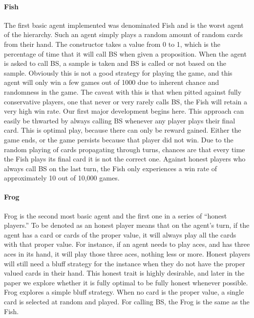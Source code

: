 \documentclass[a4paper,11pt]{article}
\begin{document}
	\paragraph{Fish}
	The first basic agent implemented was denominated Fish and is the worst agent of the hierarchy. Such an agent simply plays a random amount of random cards from their hand. The constructor takes a value from 0 to 1, which is the percentage of time that it will call BS when given a proposition. When the agent is asked to call BS, a sample is taken and BS is called or not based on the sample. Obviously this is not a good strategy for playing the game, and this agent will only win a few games out of 1000 due to inherent chance and randomness in the game. The caveat with this is that when pitted against fully conservative players, one that never or very rarely calls BS, the Fish will retain a very high win rate. Our first major development begins here. This approach can easily be thwarted by always calling BS whenever any player plays their final card. This is optimal play, because there can only be reward gained. Either the game ends, or the game persists because that player did not win. Due to the random playing of cards propagating through turns, chances are that every time the Fish plays its final card it is not the correct one. Against honest players who always call BS on the last turn, the Fish only experiences a win rate of approximately 10 out of 10,000 games. 

	\paragraph{Frog}
	Frog is the second most basic agent and the first one in a series of “honest players.” To be denoted as an honest player means that on the agent’s turn, if the agent has a card or cards of the proper value, it will always play all the cards with that proper value. For instance, if an agent needs to play aces, and has three aces in its hand, it will play those three aces, nothing less or more. Honest players will still need a bluff strategy for the instance when they do not have the proper valued cards in their hand. This honest trait is highly desirable, and later in the paper we explore whether it is fully optimal to be fully honest whenever possible. Frog explores a simple bluff strategy. When no card is the proper value, a single card is selected at random and played. For calling BS, the Frog is the same as the Fish. 
\end{document}
